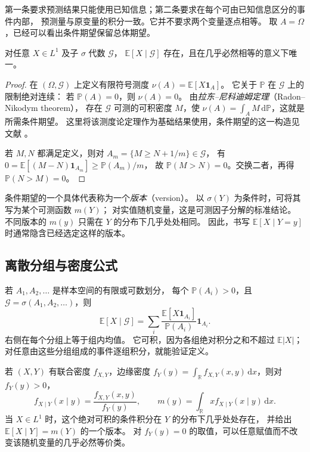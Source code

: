 \documentclass[UTF8,12pt,a4paper,fontset=fandol]{ctexart}
\begin{document}
第一条要求预测结果只能使用已知信息；第二条要求在每个可由已知信息区分的事件内部，
预测量与原变量的积分一致。它并不要求两个变量逐点相等。
取 $A=\Omega$，已经可以看出条件期望保留总体期望。

\begin{theorem}[存在性与几乎必然唯一性]
\label{thm:conditional-existence}
对任意 $X\in L^1$ 及子 $\sigma$ 代数 $\mathcal G$，
$\mathbb E[X\mid\mathcal G]$ 存在，且在几乎必然相等的意义下唯一。
\end{theorem}

\begin{proof}
在 $(\Omega,\mathcal G)$ 上定义有限符号测度
$\nu(A)=\mathbb E[X\mathbf1_A]$。
它关于 $\mathbb P$ 在 $\mathcal G$ 上的限制绝对连续：
若 $\mathbb P(A)=0$，则 $\nu(A)=0$。
由\emph{拉东--尼科迪姆定理}（Radon--Nikodym theorem），
存在 $\mathcal G$ 可测的可积密度 $M$，使
$\nu(A)=\int_A M\,\mathrm d\mathbb P$，这就是所需条件期望。
这里将该测度论定理作为基础结果使用，条件期望的这一构造见文献 \cite[第 4.1 节]{durrett-pte}。

若 $M,N$ 都满足定义，则对 $A_m=\{M\geq N+1/m\}\in\mathcal G$，
有 $0=\mathbb E[(M-N)\mathbf1_{A_m}]\geq\mathbb P(A_m)/m$，
故 $\mathbb P(M>N)=0$。交换二者，再得 $\mathbb P(N>M)=0$。
\end{proof}

条件期望的一个具体代表称为一个\emph{版本}（version）。
以 $\sigma(Y)$ 为条件时，可将其写为某个可测函数 $m(Y)$；
对实值随机变量，这是可测因子分解的标准结论。
不同版本的 $m(y)$ 只需在 $Y$ 的分布下几乎处处相同。
因此，书写 $\mathbb E[X\mid Y=y]$ 时通常隐含已经选定这样的版本。

\subsection{离散分组与密度公式}

若 $A_1,A_2,\ldots$ 是样本空间的有限或可数划分，
每个 $\mathbb P(A_i)>0$，且 $\mathcal G=\sigma(A_1,A_2,\ldots)$，则
\begin{equation}
  \mathbb E[X\mid\mathcal G]
  =\sum_i
    \frac{\mathbb E[X\mathbf1_{A_i}]}{\mathbb P(A_i)}\mathbf1_{A_i}.
  \label{eq:conditional-partition}
\end{equation}
右侧在每个分组上等于组内均值。
它可积，因为各组绝对积分之和不超过 $\mathbb E|X|$；
对任意由这些分组组成的事件逐组积分，就能验证定义。

若 $(X,Y)$ 有联合密度 $f_{X,Y}$，边缘密度
$f_Y(y)=\int_{\mathbb R}f_{X,Y}(x,y)\,\mathrm dx$，则对 $f_Y(y)>0$，
\[
  f_{X\mid Y}(x\mid y)=\frac{f_{X,Y}(x,y)}{f_Y(y)},\qquad
  m(y)=\int_{\mathbb R}x f_{X\mid Y}(x\mid y)\,\mathrm dx.
\]
当 $X\in L^1$ 时，这个绝对可积的条件积分在 $Y$ 的分布下几乎处处存在，
并给出 $\mathbb E[X\mid Y]=m(Y)$ 的一个版本。
对 $f_Y(y)=0$ 的取值，可以任意赋值而不改变该随机变量的几乎必然等价类。
\end{document}
